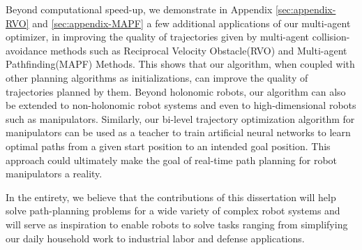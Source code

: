 Beyond computational speed-up, we demonstrate in Appendix \ref{sec:appendix-RVO} and \ref{sec:appendix-MAPF} a few additional applications of our multi-agent optimizer, in improving the quality of trajectories given by multi-agent collision-avoidance methods such as Reciprocal Velocity Obstacle(RVO) and Multi-agent Pathfinding(MAPF) Methods. This shows that our algorithm, when coupled with other planning algorithms as initializations, can improve the quality of trajectories planned by them. Beyond holonomic robots, our algorithm can also be extended to non-holonomic robot systems and even to high-dimensional robots such as manipulators. Similarly, our bi-level trajectory optimization algorithm for manipulators can be used as a teacher to train artificial neural networks to learn optimal paths from a given start position to an intended goal position. This approach could ultimately make the goal of real-time path planning for robot manipulators a reality. 

In the entirety, we believe that the contributions of this dissertation will help solve path-planning problems for a wide variety of complex robot systems and will serve as inspiration to enable robots to solve tasks ranging from simplifying our daily household work to industrial labor and defense applications. 
